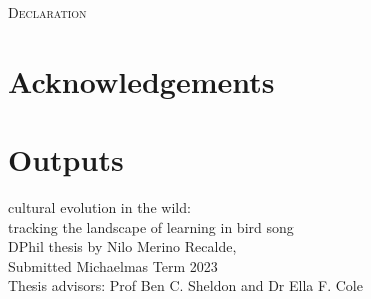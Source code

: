 \documentclass[9pt, twocolumn, twoside]{nilosthesis}
\begin{document}


\onecolumn
\normalsize

\pagecolor{white}


\normalsize
\copyrightpage




\normalsize
\onecolumn 

\vspace*{\fill - 1cm}
\begin{flushright}
{\scshape \Large{Declaration}}\\
\end{flushright}

\vspace*{\fill}


\normalsize
\pagecolor{white}


\onecolumn 
\chapter*{Acknowledgements}
\vspace{5pt}


\chapter*{Outputs}

\bgroup
\hypersetup{linkcolor = black}
\tableofcontents
\renewcommand{\cleardoublepage}{}
\renewcommand{\clearpage}{}
\listoffigures
\egroup

\clearpage{\pagestyle{empty}\cleardoublepage} %
\onecolumn
\vspace*{3cm} %

\begin{flushright}
{\titlefont\Large{cultural evolution in the wild:}}\\
\normalsize
{\titlefont\Large{tracking the landscape of learning in bird song}} \\[.5cm]
DPhil thesis by Nilo Merino Recalde,\\Submitted Michaelmas Term 2023\\
Thesis advisors: Prof Ben C. Sheldon and Dr Ella F. Cole\\
\end{flushright}
\end{document}
